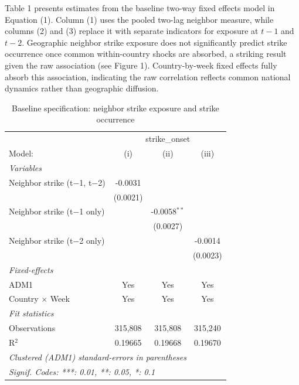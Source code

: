 \documentclass[
  11pt,
]{article}
\begin{document}
Table 1 presents estimates from the baseline two-way fixed effects model
in Equation (1). Column (1) uses the pooled two-lag neighbor measure,
while columns (2) and (3) replace it with separate indicators for
exposure at \(t-1\) and \(t-2\). Geographic neighbor strike exposure
does not significantly predict strike occurrence once common
within-country shocks are absorbed, a striking result given the raw
association (see Figure 1). Country-by-week fixed effects fully absorb
this association, indicating the raw correlation reflects common
national dynamics rather than geographic diffusion.

\begingroup
\centering
\begin{table}
\caption{Baseline specification: neighbor strike exposure and strike occurrence}\tabularnewline

\centering
\begin{tabular}{lccc}
   \hline
    & \multicolumn{3}{c}{strike\_onset}\\
   Model:                         & (i)      & (ii)           & (iii)\\  
   \midrule
   \emph{Variables}\\
   Neighbor strike (t$-$1, t$-$2) & -0.0031  &                &   \\   
                                  & (0.0021) &                &   \\   
   Neighbor strike (t$-$1 only)   &          & -0.0058$^{**}$ &   \\   
                                  &          & (0.0027)       &   \\   
   Neighbor strike (t$-$2 only)   &          &                & -0.0014\\   
                                  &          &                & (0.0023)\\   
   \midrule
   \emph{Fixed-effects}\\
   ADM1                           & Yes      & Yes            & Yes\\  
   Country $\times$ Week          & Yes      & Yes            & Yes\\  
   \midrule
   \emph{Fit statistics}\\
   Observations                   & 315,808  & 315,808        & 315,240\\  
   R$^2$                          & 0.19665  & 0.19668        & 0.19670\\  
   \hline
   \multicolumn{4}{l}{\emph{Clustered (ADM1) standard-errors in parentheses}}\\
   \multicolumn{4}{l}{\emph{Signif. Codes: ***: 0.01, **: 0.05, *: 0.1}}\\
\end{tabular}
\end{table}
\end{document}
